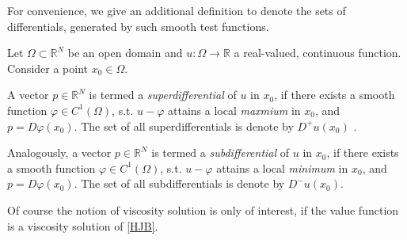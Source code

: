 	For convenience, we give an additional definition to denote the sets of differentials, generated by such smooth test functions.
	
	\begin{definition}
		Let $ \Omega \subset \mathbb{R}^N $ be an open domain and $ u : \Omega \to \mathbb{R} $ a real-valued, continuous function. Consider a point $ x_0 \in \Omega $. 
		
		A vector $ p \in \mathbb{R}^N $ is termed a \emph{superdifferential} of $ u $ in $ x_0 $, if there exists a smooth function $ \varphi \in C^{1}(\Omega) $, s.t. $ u - \varphi $ attains a local \emph{maxmium} in $ x_0 $, and $ p = D \varphi(x_0) $. The set of all superdifferentials is denote by $ D^{+}u(x_0) $ .
		
		Analogously, a vector $ p \in \mathbb{R}^N $ is termed a \emph{subdifferential} of $ u $ in $ x_0 $, if there exists a smooth function $ \varphi \in C^{1}(\Omega) $, s.t. $ u - \varphi $ attains a local \emph{minimum} in $ x_0 $, and $ p = D \varphi(x_0) $. The set of all subdifferentials is denote by $ D^{-}u(x_0) $.
	\end{definition}

	Of course the notion of viscosity solution is only of interest, if the value function is a viscosity solution of \ref{HJB}.
	
